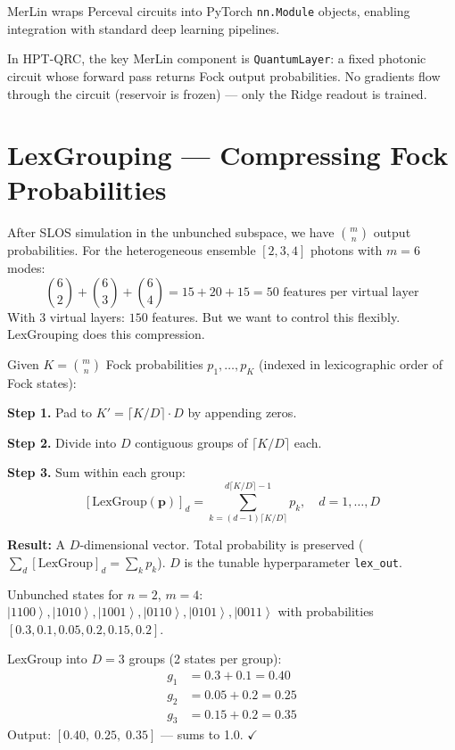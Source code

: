 \documentclass[11pt]{article}
\newcommand{\concept}[2]{%
  \begin{tcolorbox}[conceptbox, title={#1}]
  #2
  \end{tcolorbox}
}
\newcommand{\mathblock}[2]{%
  \begin{tcolorbox}[mathbox, title={Math: #1}]
  #2
  \end{tcolorbox}
}
\newcommand{\example}[2]{%
  \begin{tcolorbox}[examplebox, title={Concrete Example: #1}]
  #2
  \end{tcolorbox}
}
\providecommand{\ket}[1]{\left| #1 \right\rangle}
\begin{document}
\concept{MerLin --- Differentiable Photonic ML on Perceval}{
MerLin wraps Perceval circuits into PyTorch \texttt{nn.Module} objects,
enabling integration with standard deep learning pipelines.

In HPT-QRC, the key MerLin component is \texttt{QuantumLayer}:
a fixed photonic circuit whose forward pass returns Fock output
probabilities. No gradients flow through the circuit (reservoir
is frozen) --- only the Ridge readout is trained.
}

\section{LexGrouping --- Compressing Fock Probabilities}

\concept{The Dimensionality Problem}{
After SLOS simulation in the unbunched subspace, we have
$\binom{m}{n}$ output probabilities. For the heterogeneous ensemble
$[2,3,4]$ photons with $m = 6$ modes:
\[
  \binom{6}{2} + \binom{6}{3} + \binom{6}{4} = 15 + 20 + 15 = 50
  \text{ features per virtual layer}
\]
With 3 virtual layers: $150$ features. But we want to control this
flexibly. LexGrouping does this compression.
}

\mathblock{LexGrouping Algorithm}{
Given $K = \binom{m}{n}$ Fock probabilities $p_1, \ldots, p_K$
(indexed in lexicographic order of Fock states):

\textbf{Step 1.} Pad to $K' = \lceil K/D \rceil \cdot D$ by appending zeros.

\textbf{Step 2.} Divide into $D$ contiguous groups of $\lceil K/D\rceil$ each.

\textbf{Step 3.} Sum within each group:
\[
  [\text{LexGroup}(\mathbf{p})]_d
  = \sum_{k=(d-1)\lceil K/D\rceil}^{d\lceil K/D\rceil-1} p_k,
  \quad d = 1, \ldots, D
\]

\textbf{Result:} A $D$-dimensional vector. Total probability is preserved
($\sum_d [\text{LexGroup}]_d = \sum_k p_k$). $D$ is the tunable
hyperparameter \texttt{lex\_out}.
}

\example{LexGrouping with 6 Fock States into 3 Groups}{
Unbunched states for $n=2$, $m=4$:
$\ket{1100}, \ket{1010}, \ket{1001}, \ket{0110}, \ket{0101}, \ket{0011}$
with probabilities $[0.3, 0.1, 0.05, 0.2, 0.15, 0.2]$.

LexGroup into $D=3$ groups (2 states per group):
\begin{align*}
  g_1 &= 0.3 + 0.1 = 0.40 \\
  g_2 &= 0.05 + 0.2 = 0.25 \\
  g_3 &= 0.15 + 0.2 = 0.35
\end{align*}
Output: $[0.40,\; 0.25,\; 0.35]$ --- sums to 1.0. $\checkmark$
}
\end{document}
